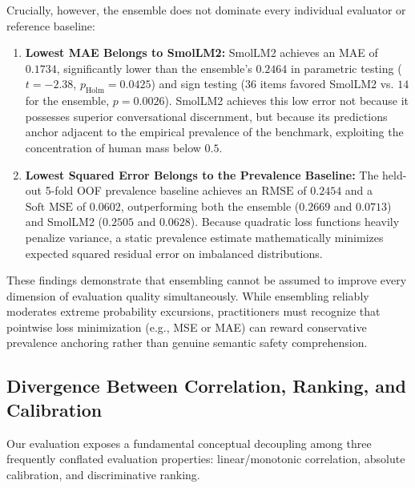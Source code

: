 Crucially, however, the ensemble does not dominate every individual evaluator or reference baseline:
\begin{enumerate}
    \item \textbf{Lowest MAE Belongs to SmolLM2:} SmolLM2 achieves an MAE of $0.1734$, significantly lower than the ensemble's $0.2464$ in parametric testing ($t=-2.38$, $p_{\text{Holm}}=0.0425$) and sign testing ($36$ items favored SmolLM2 vs. $14$ for the ensemble, $p=0.0026$). SmolLM2 achieves this low error not because it possesses superior conversational discernment, but because its predictions anchor adjacent to the empirical prevalence of the benchmark, exploiting the concentration of human mass below $0.5$.
    \item \textbf{Lowest Squared Error Belongs to the Prevalence Baseline:} The held-out 5-fold OOF prevalence baseline achieves an $\text{RMSE}$ of $0.2454$ and a $\text{Soft MSE}$ of $0.0602$, outperforming both the ensemble ($0.2669$ and $0.0713$) and SmolLM2 ($0.2505$ and $0.0628$). Because quadratic loss functions heavily penalize variance, a static prevalence estimate mathematically minimizes expected squared residual error on imbalanced distributions.
\end{enumerate}

These findings demonstrate that ensembling cannot be assumed to improve every dimension of evaluation quality simultaneously. While ensembling reliably moderates extreme probability excursions, practitioners must recognize that pointwise loss minimization (e.g., MSE or MAE) can reward conservative prevalence anchoring rather than genuine semantic safety comprehension.

\subsection{Divergence Between Correlation, Ranking, and Calibration}
\label{subsec:disc_correlation_ranking_calibration}

Our evaluation exposes a fundamental conceptual decoupling among three frequently conflated evaluation properties: linear/monotonic correlation, absolute calibration, and discriminative ranking.

